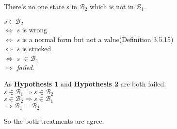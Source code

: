 \documentclass[a4paper, 12pt]{article}
\begin{document}
\begin{description}
\begin{hyp}
There's no one state s in $\mathcal{B}_2$ which is not in $\mathcal{B}_1$. 
\end{hyp}
$ s \in \mathcal{B}_2$ \\
$\Leftrightarrow$ $s$ is wrong \\
$\Leftrightarrow$ $s$ is a normal form but not a value(Definition 3.5.15)\\
$\Leftrightarrow$ $s$ is stucked \\
$\Leftrightarrow$ $s$ $\in \mathcal{B}_1$\\
$\Longrightarrow$ \textit{failed}.

As \textbf{Hypothesis 1} and \textbf{Hypothesis 2} are both failed. \\
$s \in \mathcal{B}_1 \Rightarrow s \in \mathcal{B}_2$\\
$s \in \mathcal{B}_2 \Rightarrow s \in \mathcal{B}_1$\\
$\Longrightarrow \mathcal{B}_1 = \mathcal{B}_2$

So the both treatments are agree.

\end{description}
\end{document}
